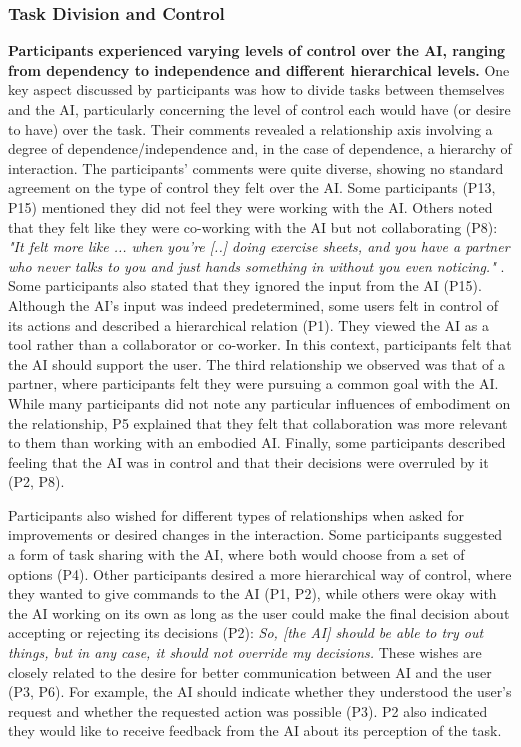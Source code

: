 \subsubsection{Task Division and Control}
\textbf{Participants experienced varying levels of control over the AI, ranging from dependency to independence and different hierarchical levels.}
One key aspect discussed by participants was how to divide tasks between themselves and the AI, particularly concerning the level of control each would have (or desire to have) over the task.
Their comments revealed a relationship axis involving a degree of dependence/independence and, in the case of dependence, a hierarchy of interaction. The participants' comments were quite diverse, showing no standard agreement on the type of control they felt over the AI.
Some participants (P13, P15) mentioned they did not feel they were working with the AI. Others noted that they felt like they were co-working with the AI but not collaborating (P8): \textit{"It felt more like ... when you're [..] doing exercise sheets, and you have a partner who never talks to you and just hands something in without you even noticing." }. Some participants also stated that they ignored the input from the AI (P15).
Although the AI's input was indeed predetermined, some users felt in control of its actions and described a hierarchical relation (P1). They viewed the AI as a tool rather than a collaborator or co-worker. In this context, participants felt that the AI should support the user.
The third relationship we observed was that of a partner, where participants felt they were pursuing a common goal with the AI.
While many participants did not note any particular influences of embodiment on the relationship, P5 explained that they felt that collaboration was more relevant to them than working with an embodied AI.
Finally, some participants described feeling that the AI was in control and that their decisions were overruled by it (P2, P8).

Participants also wished for different types of relationships when asked for improvements or desired changes in the interaction.
Some participants suggested a form of task sharing with the AI, where both would choose from a set of options (P4).
Other participants desired a more hierarchical way of control, where they wanted to give commands to the AI (P1, P2), while others were okay with the AI working on its own as long as the user could make the final decision about accepting or rejecting its decisions (P2): \textit{So, [the AI] should be able to try out things, but in any case, it should not override my decisions.}
These wishes are closely related to the desire for better communication between AI and the user (P3, P6). For example, the AI should indicate whether they understood the user's request and whether the requested action was possible (P3). P2 also indicated they would like to receive feedback from the AI about its perception of the task.

